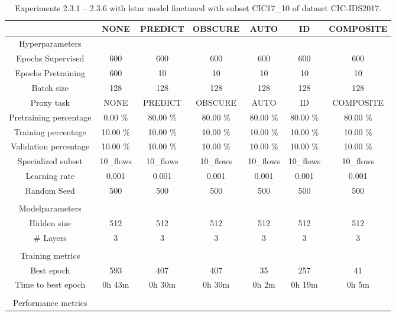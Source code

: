 \begin{table}[htb]
    \centering
    \caption{Experiments 2.3.1 – 2.3.6 with \gls{lstm} model finetuned with subset CIC17_10 of dataset CIC-IDS2017.}
    \label{table:results:lstm:flows_subset}
    \begin{tabular}{@{}ccccccc@{}}
        \toprule
         &  NONE &  PREDICT &  OBSCURE &  AUTO &  ID &  COMPOSITE \\
        \midrule
        Hyperparameters &  &  &  &  &  &  \\
        Epochs Supervised &  600 &  600 &  600 &  600 &  600 &  600 \\
        Epochs Pretraining &  600 &  10 &  10 &  10 &  10 &  10 \\
        Batch size &  128 &  128 &  128 &  128 &  128 &  128 \\
        Proxy task &  NONE &  PREDICT &  OBSCURE &  AUTO &  ID &  COMPOSITE \\
        Pretraining percentage &  0.00 \% &  80.00 \% &  80.00 \% &  80.00 \% &  80.00 \% &  80.00 \% \\
        Training percentage &  10.00 \% &  10.00 \% &  10.00 \% &  10.00 \% &  10.00 \% &  10.00 \% \\
        Validation percentage &  10.00 \% &  10.00 \% &  10.00 \% &  10.00 \% &  10.00 \% &  10.00 \% \\
        Specialized subset &  10\_flows &  10\_flows &  10\_flows &  10\_flows &  10\_flows &  10\_flows \\
        Learning rate &  0.001 &  0.001 &  0.001 &  0.001 &  0.001 &  0.001 \\
        Random Seed &  500 &  500 &  500 &  500 &  500 &  500 \\
         \\
        Modelparameters &  &  &  &  &  &  \\
        Hidden size &  512 &  512 &  512 &  512 &  512 &  512 \\
        \# Layers &  3 &  3 &  3 &  3 &  3 &  3 \\
         \\
        Training metrics &  &  &  &  &  &  \\
        Best epoch &  593 &  407 &  407 &  35 &  257 &  41 \\
        Time to best epoch &  0h 43m &  0h 30m &  0h 30m &  0h 2m &  0h 19m &  0h 5m \\
         \\
        Performance metrics &  &  &  &  &  &  \\

\end{tabular}
\end{table}
